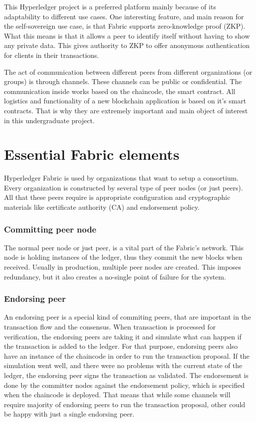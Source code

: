 \documentclass[a4paper,11pt]{report}
\begin{document}
	This Hyperledger project is a preferred platform mainly because of its adaptability to different use cases. One interesting feature, and main reason for the self-sovereign use case, is that Fabric supports zero-knowledge proof (ZKP). What this means is that it allows a peer to identify itself without having to show any private data. This gives authority to ZKP to offer anonymous authentication for clients in their transactions. \cite{li2018fppb}
	
	The act of communication between different peers from different organizations (or groups) is through channels. These channels can be public or confidential. The communication inside works based on the chaincode, the smart contract. All logistics and functionality of a new blockchain application is based on it’s smart contracts. That is why they are extremely important and main object of interest in this undergraduate project.
	
	
\section{Essential Fabric elements}
\label{felements}
Hyperledger Fabric is used by organizations that want to setup a consortium. Every organization is constructed by several type of peer nodes (or just peers). All that these peers require is appropriate configuration and cryptographic materials like certificate authority (CA) and endorsement policy.
\subsubsection{Committing peer node}
The normal peer node or just peer, is a vital part of the Fabric’s network. This node is holding instances of the ledger, thus they commit the new blocks when received. Usually in production, multiple peer nodes are created. This imposes redundancy, but it also creates a no-single point of failure for the system. 
\subsubsection{Endorsing peer}
An endorsing peer is a special kind of commiting peers, that are important in the transaction flow and the consensus. When transaction is processed for verification, the endorsing peers are taking it and simulate what can happen if the transaction is added to the ledger. For that purpose, endorsing peers also have an instance of the chaincode in order to run the transaction proposal. If the simulation went well, and there were no problems with the current state of the ledger, the endorsing peer signs the transaction as validated. The endorsement is done by the committer nodes against the endorsement policy, which is specified when the chaincode is deployed. That means that while some channels will require majority of endorsing peers to run the transaction proposal, other could be happy with just a single endorsing peer.
\end{document}
